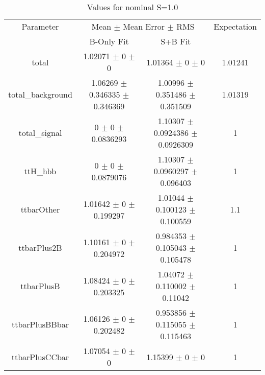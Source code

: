 \begin{table}
\centering
\caption{Values for nominal S=1.0}
\begin{tabular}{cccc}
\toprule
Parameter & \multicolumn{2}{c}{Mean $\pm$ Mean Error $\pm$ RMS} & Expectation\\
 & B-Only Fit & S+B Fit & \\
\midrule
total & \num{1.02071} $\pm$ \num{0} $\pm$ \num{0} & \num{1.01364} $\pm$ \num{0} $\pm$ \num{0} & \num{1.01241}\\
total\_background & \num{1.06269} $\pm$ \num{0.346335} $\pm$ \num{0.346369} & \num{1.00996} $\pm$ \num{0.351486} $\pm$ \num{0.351509} & \num{1.01319}\\
total\_signal & \num{0} $\pm$ \num{0} $\pm$ \num{0.0836293} & \num{1.10307} $\pm$ \num{0.0924386} $\pm$ \num{0.0926309} & \num{1}\\
ttH\_hbb & \num{0} $\pm$ \num{0} $\pm$ \num{0.0879076} & \num{1.10307} $\pm$ \num{0.0960297} $\pm$ \num{0.096403} & \num{1}\\
ttbarOther & \num{1.01642} $\pm$ \num{0} $\pm$ \num{0.199297} & \num{1.01044} $\pm$ \num{0.100123} $\pm$ \num{0.100559} & \num{1.1}\\
ttbarPlus2B & \num{1.10161} $\pm$ \num{0} $\pm$ \num{0.204972} & \num{0.984353} $\pm$ \num{0.105043} $\pm$ \num{0.105478} & \num{1}\\
ttbarPlusB & \num{1.08424} $\pm$ \num{0} $\pm$ \num{0.203325} & \num{1.04072} $\pm$ \num{0.110002} $\pm$ \num{0.11042} & \num{1}\\
ttbarPlusBBbar & \num{1.06126} $\pm$ \num{0} $\pm$ \num{0.202482} & \num{0.953856} $\pm$ \num{0.115055} $\pm$ \num{0.115463} & \num{1}\\
ttbarPlusCCbar & \num{1.07054} $\pm$ \num{0} $\pm$ \num{0} & \num{1.15399} $\pm$ \num{0} $\pm$ \num{0} & \num{1}\\
\bottomrule
\end{tabular}
\end{table}